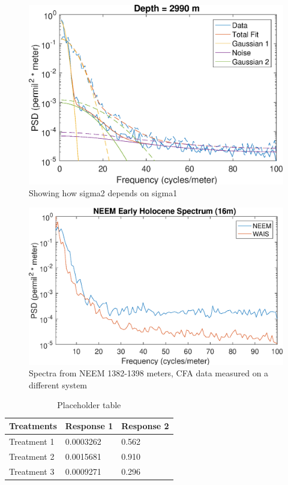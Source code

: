 \documentclass[draft, jgrga]{AGUTeX}
\begin{document}
\begin{figure}
\includegraphics[width=.9\linewidth]{sigmadependence.eps}
\caption{Showing how sigma2 depends on sigma1}\label{sigmadependence}
\end{figure}

\begin{figure}
\includegraphics[width=.9\linewidth]{NEEMspec.eps}
\caption{Spectra from NEEM 1382-1398 meters, CFA data measured on a different system}\label{NEEMspec}
\end{figure}

\begin{table}
\caption{Placeholder table}\label{sampletable}
\begin{tabular}{l l l}
\hline
\textbf{Treatments} & \textbf{Response 1} & \textbf{Response 2}\\
\hline
Treatment 1 & 0.0003262 & 0.562 \\
Treatment 2 & 0.0015681 & 0.910 \\
Treatment 3 & 0.0009271 & 0.296 \\
\hline
\end{tabular}
\end{table}
\end{document}
